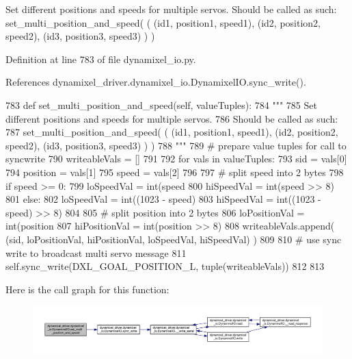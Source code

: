 \begin{DoxyVerb}Set different positions and speeds for multiple servos.
Should be called as such:
set_multi_position_and_speed( ( (id1, position1, speed1), (id2, position2, speed2), (id3, position3, speed3) ) )
\end{DoxyVerb}
 

Definition at line 783 of file dynamixel\+\_\+io.\+py.



References dynamixel\+\_\+driver.\+dynamixel\+\_\+io.\+Dynamixel\+I\+O.\+sync\+\_\+write().


\begin{DoxyCode}
783     \textcolor{keyword}{def }set\_multi\_position\_and\_speed(self, valueTuples):
784         \textcolor{stringliteral}{"""}
785 \textcolor{stringliteral}{        Set different positions and speeds for multiple servos.}
786 \textcolor{stringliteral}{        Should be called as such:}
787 \textcolor{stringliteral}{        set\_multi\_position\_and\_speed( ( (id1, position1, speed1), (id2, position2, speed2), (id3,
       position3, speed3) ) )}
788 \textcolor{stringliteral}{        """}
789         \textcolor{comment}{# prepare value tuples for call to syncwrite}
790         writeableVals = []
791 
792         \textcolor{keywordflow}{for} vals \textcolor{keywordflow}{in} valueTuples:
793             sid = vals[0]
794             position = vals[1]
795             speed = vals[2]
796 
797             \textcolor{comment}{# split speed into 2 bytes}
798             \textcolor{keywordflow}{if} speed >= 0:
799                 loSpeedVal = int(speed %
800                 hiSpeedVal = int(speed >> 8)
801             \textcolor{keywordflow}{else}:
802                 loSpeedVal = int((1023 - speed) %
803                 hiSpeedVal = int((1023 - speed) >> 8)
804 
805             \textcolor{comment}{# split position into 2 bytes}
806             loPositionVal = int(position %
807             hiPositionVal = int(position >> 8)
808             writeableVals.append( (sid, loPositionVal, hiPositionVal, loSpeedVal, hiSpeedVal) )
809 
810         \textcolor{comment}{# use sync write to broadcast multi servo message}
811         self.sync\_write(DXL\_GOAL\_POSITION\_L, tuple(writeableVals))
812 
813 
\end{DoxyCode}
Here is the call graph for this function\+:
\nopagebreak
\begin{figure}[H]
\begin{center}
\leavevmode
\includegraphics[width=350pt]{dd/d77/classdynamixel__driver_1_1dynamixel__io_1_1_dynamixel_i_o_a124b89dc055f8f5ff807d8d976115529_cgraph}
\end{center}
\end{figure}
